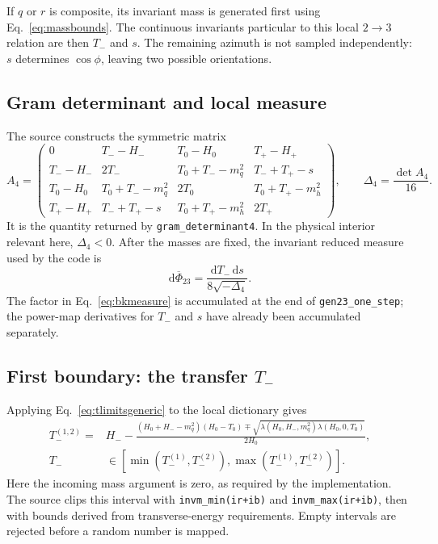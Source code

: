 \documentclass[11pt,a4paper]{article}
\newcommand{\dd}{\mathrm{d}}
\newcommand{\code}[1]{\texttt{#1}}
\newcommand{\lam}{\lambda}
\begin{document}
If $q$ or $r$ is composite, its invariant mass is generated first using
Eq.~\eqref{eq:massbounds}.  The continuous invariants particular to this
local $2\to3$ relation are then $T_-$ and $s$.  The remaining azimuth is not
sampled independently: $s$ determines $\cos\phi$, leaving two possible
orientations.

\subsection{Gram determinant and local measure}

The source constructs the symmetric matrix
\begin{equation}
 A_4=\begin{pmatrix}
 0&T_--H_-&T_0-H_0&T_+-H_+\\
 T_--H_-&2T_-&T_0+T_--m_q^2&T_-+T_+-s\\
 T_0-H_0&T_0+T_--m_q^2&2T_0&T_0+T_+-m_h^2\\
 T_+-H_+&T_-+T_+-s&T_0+T_+-m_h^2&2T_+
 \end{pmatrix},\qquad
 \Delta_4=\frac{\det A_4}{16}.
 \label{eq:gram4}
\end{equation}
It is the quantity returned by \code{gram\_determinant4}.  In the physical
interior relevant here, $\Delta_4<0$.  After the masses are fixed, the
invariant reduced measure used by the code is
\begin{equation}
 \dd\overline\Phi_{23}=\frac{\dd T_-\,\dd s}{8\sqrt{-\Delta_4}}.
 \label{eq:bkmeasure}
\end{equation}
The factor in Eq.~\eqref{eq:bkmeasure} is accumulated at the end of
\code{gen23\_one\_step}; the power-map derivatives for $T_-$ and $s$ have
already been accumulated separately.

\subsection{First boundary: the transfer $T_-$}

Applying Eq.~\eqref{eq:tlimitsgeneric} to the local dictionary gives
\begin{align}
 T_-^{(1,2)}={}&H_- -
 \frac{(H_0+H_--m_q^2)(H_0-T_0)
 \mp\sqrt{\lam(H_0,H_-,m_q^2)\lam(H_0,0,T_0)}}{2H_0},\\
 T_-&\in[\min(T_-^{(1)},T_-^{(2)}),\max(T_-^{(1)},T_-^{(2)})].
 \label{eq:bktbound}
\end{align}
Here the incoming mass argument is zero, as required by the implementation.
The source clips this interval with \code{invm\_min(ir+ib)} and
\code{invm\_max(ir+ib)}, then with bounds derived from transverse-energy
requirements.  Empty intervals are rejected before a random number is mapped.
\end{document}
